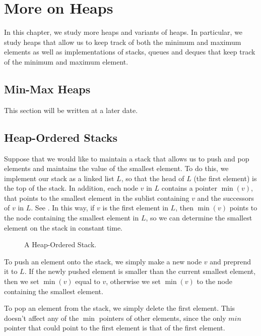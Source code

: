 \chapter{More on Heaps}


In this chapter, we study more heaps and variants of heaps.  In
particular, we study heaps that allow us to keep track of both the
minimum and maximum elements as well as implementations of stacks,
queues and deques that keep track of the minimum and maximum element.

\section{Min-Max Heaps}

This section will be written at a later date.

\section{Heap-Ordered Stacks}

Suppose that we would like to maintain a stack that allows us to push
and pop elements and maintains the value of the smallest element.  To
do this, we implement our stack as a linked list $L$, so that the head
of $L$ (the first element) is the top of the stack.  In addition, each
node $v$ in $L$ contains a pointer $\min(v)$, that points to the
smallest element in the sublist containing $v$ and the successors of
$v$ in $L$. See . In this way, if $v$ is the first
element in $L$, then $\min(v)$ points to the node containing the
smallest element in $L$, so we can determine the smallest element on
the stack in constant time.

\begin{figure}
\caption{A Heap-Ordered Stack.}
\end{figure}

To push an element onto the stack, we simply make a new node $v$ and
preprend it to $L$.  If the newly pushed element is smaller than the
current smallest element, then we set $\min(v)$ equal to $v$,
otherwise we set $\min(v)$ to the node containing the smallest
element.

To pop an element from the stack, we simply delete the first element.
This doesn't affect any of the $\min$ pointers of other elements,
since the only $min$ pointer that could point to the first element is
that of the first element.

